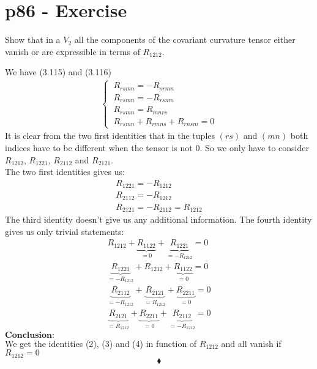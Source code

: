 \section{p86 - Exercise}
\begin{tcolorbox}
Show that in a $V_2$ all the components of the covariant curvature tensor either vanish or are expressible in terms of $R_{1212}$.
\end{tcolorbox}
We have (3.115) and (3.116)
\begin{align}
\left \{ \begin{array}{l}
\ R_{rsmn} =  - R_{srmn}\\
\ R_{rsmn} =  - R_{rsnm}\\
\ R_{rsmn} =   R_{mnrs}\\
\ R_{rsmn} + R_{rmns}+R_{rnsm}=0
\end{array} \right.
\end{align}
It is clear from the two first identities that  in the tuples $(rs)$ and $(mn)$ both indices have to be different when the tensor is not $0$. So we only have to consider $R_{1212}$,  $R_{1221}$, $R_{2112}$ and $R_{2121}$.\\
The two first  identities gives us:
\begin{align}
 R_{1221}= -R_{1212}\\
 R_{2112}= -R_{1212}\\
 R_{2121}= -R_{2112} = R_{1212}
\end{align}
The third identity doesn't  give us any additional information.
The fourth identity gives us only trivial statements:
\begin{align}
 R_{1212} + \underbrace{R_{1122}}_{=0}+\underbrace{R_{1221}}_{=- R_{1212} } = 0\\
 \underbrace{R_{1221}}_{=- R_{1212}} + R_{1212}+\underbrace{R_{1122}}_{=0 } = 0\\
 \underbrace{R_{2112}}_{=- R_{1212}} + \underbrace{R_{2121}}_{=R_{1212}}+\underbrace{R_{2211}}_{=0} = 0\\
 \underbrace{R_{2121}}_{= R_{1212}} + \underbrace{R_{2211}}_{=0}+\underbrace{R_{2112}}_{= -R_{1212}} = 0
\end{align}
$\textbf{Conclusion:}$\\
We get the identities (2), (3) and (4) in function of $R_{1212}$ and all vanish if $R_{1212} = 0$
$$\blacklozenge$$
\newpage

